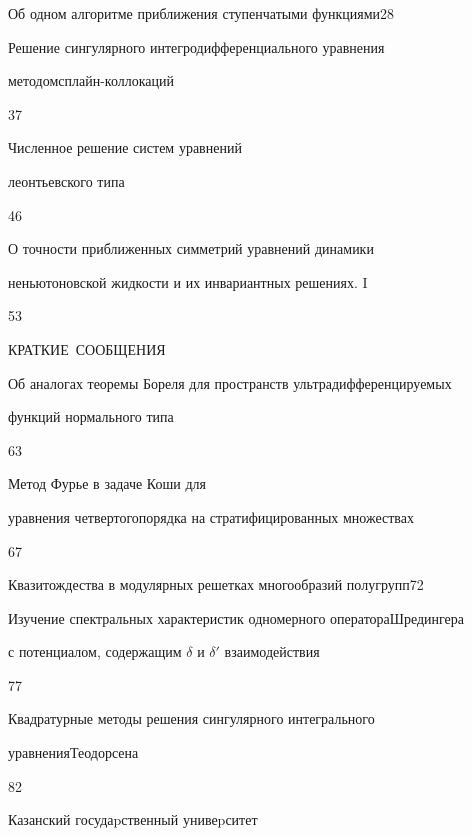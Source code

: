 

{Об одном алгоритме приближения ступенчатыми функциями}{28}




{Решение сингулярного интегродифференциального уравнения  


методом\newline сплайн-коллокаций}{37}




{Численное решение систем уравнений


леонтьевского типа}{46}




{О точности приближенных симметрий уравнений динамики \newline


неньютоновской жидкости и их инвариантных решениях. I}{53}








\bigskip


\par


\centerline{\Large КРАТКИЕ~СООБЩЕНИЯ}


\bigskip







{Об аналогах теоремы Бореля для пространств ультрадифференцируемых \newline


функций нормального типа}{63}




{Метод Фурье в задаче Коши для 


уравнения четвертого\newline порядка на стратифицированных множествах}{67}




{Квазитождества в модулярных решетках многообразий полугрупп}{72}




{Изучение спектральных характеристик одномерного оператора\newline Шредингера 


с потенциалом, содержащим $\delta$ и $\delta'$ взаимодействия}{77}




{Квадратурные методы решения сингулярного интегрального 


уравнения\newline Теодорсена}{82}








\vfill


\noindent\raisebox{2pt}{\copyright} Казанский госудаpственный унивеpситет





